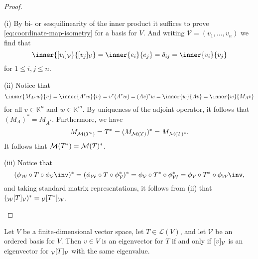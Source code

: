 \documentclass[article, a4paper, 11pt, oneside]{memoir}
\numberwithin{equation}{chapter}
\newcommand{\calL}{\mathcal{L}}
\newcommand{\calV}{\mathcal{V}}
\newcommand{\calW}{\mathcal{W}}
\begin{document}
\begin{proof}
\begin{proofsec}
    \item[(i)]
    By bi- or sesquilinearity of the inner product it suffices to prove \cref{eq:coordinate-map-isometry} for a basis for $V$. And writing $\calV = (v_1, \ldots, v_n)$ we find that
    \begin{equation*}
        \inner{\coordvec{v_i}{\calV}}{\coordvec{v_j}{\calV}}
            = \inner{e_i}{e_j}
            = \delta_{ij}
            = \inner{v_i}{v_j}
    \end{equation*}
    for $1 \leq i,j \leq n$.

    \item[(ii)]
    Notice that
    \begin{equation*}
        \inner{M_{A^*} w}{v}
            = \inner{A^* w}{v}
            = v^* (A^* w)
            = (Av)^* w
            = \inner{w}{Av}
            = \inner{w}{M_A v}
    \end{equation*}
    for all $v \in \mathbb{K}^n$ and $w \in \mathbb{K}^m$. By uniqueness of the adjoint operator, it follows that $(M_A)^* = M_{A^*}$. Furthermore, we have
    \begin{equation*}
        M_{\mathcal{M}(T^*)}
            = T^*
            = (M_{\mathcal{M}(T)})^*
            = M_{\mathcal{M}(T)^*}.
    \end{equation*}
    It follows that $\mathcal{M}(T^*) = \mathcal{M}(T)^*$.

    \item[(iii)]
    Notice that
    \begin{equation*}
        (\coordmap{\calW} \circ T \circ \coordmap{\calV}\inv)^*
            = (\coordmap{\calW} \circ T \circ \coordmap{\calV}^*)^*
            = \coordmap{\calV} \circ T^* \circ \coordmap{\calW}^*
            = \coordmap{\calV} \circ T^* \circ \coordmap{\calW}\inv,
    \end{equation*}
    and taking standard matrix representations, it follows from (ii) that $(\mr{\calW}{T}{\calV})^* = \mr{\calV}{T^*}{\calW}$.
\end{proofsec}
\end{proof}


\begin{lemma}
    \label{lemma:mr-eigenvalues}
    Let $V$ be a finite-dimensional vector space, let $T \in \calL(V)$, and let $\calV$ be an ordered basis for $V$. Then $v \in V$ is an eigenvector for $T$ if and only if $\coordvec{v}{\calV}$ is an eigenvector for $\mr{\calV}{T}{\calV}$ with the same eigenvalue.
\end{lemma}
\end{document}
